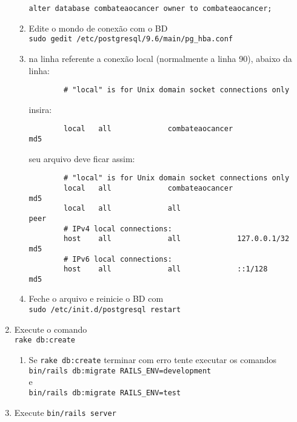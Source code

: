 \documentclass[12pt,a4paper]{article}
\begin{document}
\begin{enumerate}
\begin{enumerate}
		\texttt{alter database combateaocancer owner to combateaocancer;}
		\item Edite o mondo de conexão com o BD\\
		\texttt{sudo gedit /etc/postgresql/9.6/main/pg\_hba.conf}
		\item na linha referente a conexão local (normalmente a linha 90), abaixo da linha:
		\begin{verbatim}
		# "local" is for Unix domain socket connections only
		\end{verbatim}
		insira:
		\begin{verbatim}
		local   all             combateaocancer                         md5
		\end{verbatim}
		seu arquivo deve ficar assim:
		\begin{verbatim}
		# "local" is for Unix domain socket connections only
		local   all             combateaocancer                         md5
		local   all             all                                     peer
		# IPv4 local connections:
		host    all             all             127.0.0.1/32            md5
		# IPv6 local connections:
		host    all             all             ::1/128                 md5
		\end{verbatim}
		\item Feche o arquivo e reinicie o BD com \\
		\texttt{sudo /etc/init.d/postgresql restart}
	\end{enumerate}
	\item Execute o comando\\
	\texttt{rake db:create}
	\begin{enumerate}
		\item Se \texttt{rake db:create} terminar com erro tente executar os comandos\\
		\texttt{bin/rails db:migrate RAILS\_ENV=development}\\
		e\\
		\texttt{bin/rails db:migrate RAILS\_ENV=test}
	\end{enumerate}
	\item Execute \texttt{bin/rails server}
\end{enumerate}
\end{document}
